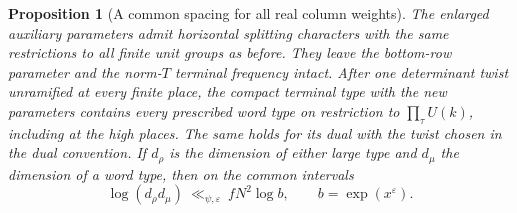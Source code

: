 \documentclass[a4paper,11pt]{article}
\newtheorem{proposition}{Proposition}[section]
\theoremstyle{definition}
\theoremstyle{remark}
\numberwithin{equation}{section}
\begin{document}
\begin{proposition}[A common spacing for all real column weights]\leavevmode
\label{prop:spacing276}
The enlarged auxiliary parameters admit horizontal splitting
characters with the same restrictions to all finite unit
groups as before. They leave the bottom-row parameter and
the norm-\(T\) terminal frequency intact. After one determinant
twist unramified at every finite place, the compact terminal
type with the new parameters contains every prescribed word
type on restriction to \(\prod_\tau U(k)\), including at
the high places. The same holds for its dual with the twist
chosen in the dual convention. If \(d_\rho\) is the dimension
of either large type and \(d_\mu\) the dimension of a word
type, then on the common intervals
\[
       \log(d_\rho d_\mu)\ \ll_{\psi,\varepsilon}\ fN^2\log b,
              \qquad b=\exp(x^\varepsilon).
\]
\end{proposition}
\end{document}
